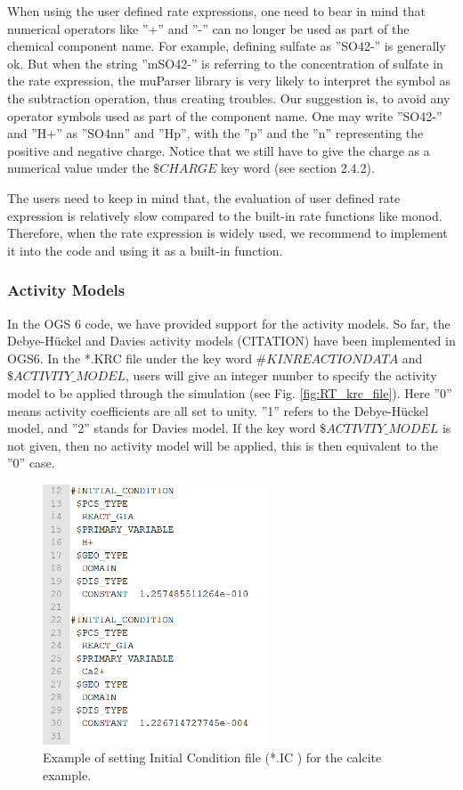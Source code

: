 When using the user defined rate expressions, one need to bear in mind that numerical operators like ''+'' and ''-'' can no longer be used as part of the chemical component name. For example, defining sulfate as ''SO42-'' is generally ok. But when the string ''mSO42-'' is referring to the concentration of sulfate in the rate expression, the muParser library is very likely to interpret the symbol as the subtraction operation, thus creating troubles. Our suggestion is, to avoid any operator symbols used as part of the component name. One may write ''SO42-'' and ''H+'' as ''SO4nn'' and ''Hp'', with the ''p'' and the ''n'' representing the positive and negative charge. Notice that we still have to give the charge as a numerical value under the $\$CHARGE$ key word (see section 2.4.2). 

The users need to keep in mind that, the evaluation of user defined rate expression is relatively slow compared to the built-in rate functions like monod. Therefore, when the rate expression is widely used, we recommend to implement it into the code and using it as a built-in function. 

\subsubsection{Activity Models}

In the OGS 6 code, we have provided support for the activity models. So far, the Debye-H\"uckel and Davies activity models (CITATION) have been implemented in OGS6. In the *.KRC file under the key word $\#KINREACTIONDATA$ and $\$ACTIVITY\_MODEL$, users will give an integer number to specify the activity model to be applied through the simulation (see Fig. \ref{fig:RT_krc_file}). Here ''0'' means activity coefficients are all set to unity. ''1'' refers to the Debye-H\"uckel model, and ''2'' stands for Davies model. If the key word $\$ACTIVITY\_MODEL$ is not given, then no activity model will be applied, this is then equivalent to the ''0'' case. 

\begin{figure}
\includegraphics[width=0.6\textwidth]{RT/figs/RT_fig_ic_file}
\caption{Example of setting Initial Condition file (*.IC ) for the calcite example. }
\label{fig:RT_fig_ic_file}
\end{figure}

